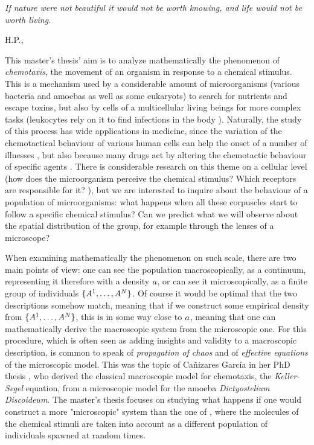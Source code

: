 \epigraph{
	\textit{
		If nature were not beautiful it would not be worth knowing, and life would not be worth living.
	}
}{
	H.P., \cite{science-and-hypothesis}
}


This master's thesis' aim is to analyze mathematically the phenomenon of \emph{chemotaxis}, \ie the movement of an organism in response to a chemical stimulus.
This is a mechanism used by a considerable amount of microorganisms (various bacteria and amoebas as well as some eukaryots) to search for nutrients and escape toxins, but also by cells of a multicellular living beings for more complex tasks (\eg leukocytes rely on it to find infections in the body \cite{chemotaxis-leukocytes}).
Naturally, the study of this process has wide applications in medicine, since the variation of the chemotactical behaviour of various human cells can help the onset of a number of illnesses \cite{ct-diseases}, but also because many drugs act by altering the chemotactic behaviour of specific agents \cite[Conclusions and perspectives]{cancer-medicine-chemotaxis}.
There is considerable research on this theme on a cellular level (how does the microorganism perceive the chemical stimulus? Which receptors are responsible for it? \cite{ct-chemical-mechanisms}), but we are interested to inquire about the behaviour of a population of microorganisms: what happens when all these corpuscles start to follow a specific chemical stimulus? Can we predict what we will observe about the spatial distribution of the group, for example through the lenses of a microscope? 


When examining mathematically the phenomenon on such scale, there are two main points of view:
one can see the population macroscopically, as a continuum, representing it therefore with a density $a$, or can see it microscopically, \ie as a finite group of individuals $\{A^1, \ldots, A^N\}$.
Of course it would be optimal that the two descriptions somehow match, meaning that if we construct some empirical density from $\{A^1, \ldots, A^N\}$, this is in some way close to $a$, meaning that one can mathematically derive the macroscopic system from the microscopic one.
For this procedure, which is often seen as adding insights and validity to a macroscopic description, is common to speak of \emph{propagation of chaos} and of \emph{effective equations} of the microscopic model.
This was the topic of Cañizares García in her PhD thesis \cite{ana}, who derived the classical macroscopic model for chemotaxis, the \emph{Keller-Segel} equation, from a microscopic model for the amoeba \emph{Dictyostelium Discoideum}.
The master's thesis focuses on studying what happens if one would construct a more "microscopic" system than the one of \cite{ana}, where the molecules of the chemical stimuli are taken into account as a different population of individuals spawned at random times.


